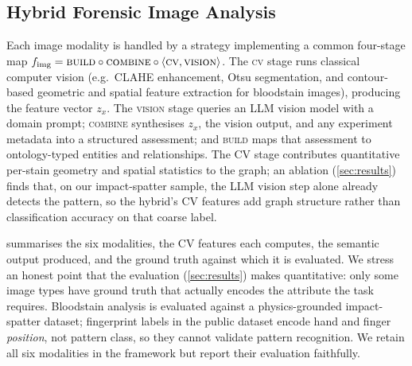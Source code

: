 \documentclass[conference]{IEEEtran}
\begin{document}
\subsection{Hybrid Forensic Image Analysis}
\label{sec:image}

Each image modality is handled by a strategy implementing a common four-stage
map $f_{\text{img}}=\textsc{build}\circ\textsc{combine}\circ\langle\textsc{cv},
\textsc{vision}\rangle$. The \textsc{cv} stage runs classical computer vision
(e.g.\ CLAHE enhancement, Otsu segmentation, and contour-based geometric and
spatial feature extraction for bloodstain images), producing the feature vector
$z_x$. The \textsc{vision} stage queries an LLM vision model with a domain prompt;
\textsc{combine} synthesises $z_x$, the vision output, and any experiment
metadata into a structured assessment; and \textsc{build} maps that assessment to
ontology-typed entities and relationships. The CV stage contributes quantitative
per-stain geometry and spatial statistics to the graph; an ablation
(\cref{sec:results}) finds that, on our impact-spatter sample, the LLM vision step
alone already detects the pattern, so the hybrid's CV features add graph structure
rather than classification accuracy on that coarse label.

 summarises the six modalities, the CV features each computes,
the semantic output produced, and the ground truth against which it is evaluated.
We stress an honest point that the evaluation (\cref{sec:results}) makes
quantitative: only some image types have ground truth that actually encodes the
attribute the task requires. Bloodstain analysis is evaluated against a
physics-grounded impact-spatter dataset; fingerprint labels in the public dataset
encode hand and finger \emph{position}, not pattern class, so they cannot
validate pattern recognition. We retain all six modalities in the framework but
report their evaluation faithfully.
\end{document}
